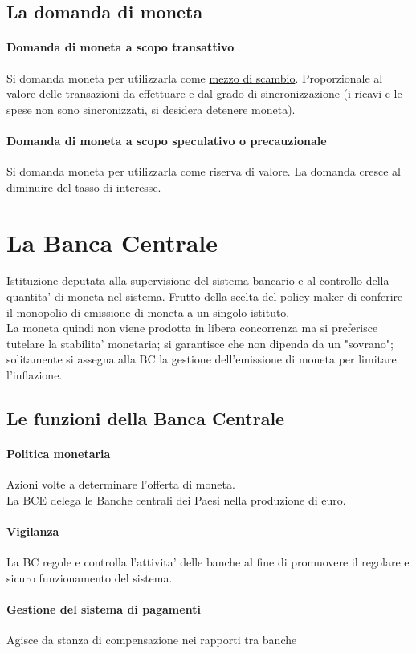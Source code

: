 \documentclass{report}
\begin{document}
	\subsection{La domanda di moneta}
	\paragraph{Domanda di moneta  a scopo transattivo} Si domanda moneta per utilizzarla come \underline{mezzo di scambio}. Proporzionale al valore delle transazioni da effettuare e dal grado di sincronizzazione (i ricavi e le spese non sono sincronizzati, si desidera detenere moneta).
	\paragraph{Domanda di moneta a scopo speculativo o precauzionale} Si domanda moneta per utilizzarla come riserva di valore. La domanda cresce al diminuire del tasso di interesse.
	\section{La Banca Centrale}
	Istituzione deputata alla supervisione del sistema bancario e al controllo della quantita' di moneta nel sistema. Frutto della scelta del policy-maker di conferire il monopolio di emissione di moneta a un singolo istituto.
	\medskip \\La moneta quindi non viene prodotta in libera concorrenza ma si preferisce tutelare la stabilita' monetaria; si garantisce che non dipenda da un "sovrano"; solitamente si assegna alla BC la gestione dell'emissione di moneta per limitare l'inflazione.
	\subsection{Le funzioni della Banca Centrale}
	\paragraph{Politica monetaria} Azioni volte a determinare l'offerta di moneta. \medskip \\La BCE delega le Banche centrali dei Paesi nella produzione di euro.
	\paragraph{Vigilanza} La BC regole e controlla l'attivita' delle banche al fine di promuovere il regolare e sicuro funzionamento del sistema.
	\paragraph{Gestione del sistema di pagamenti} Agisce da stanza di compensazione nei rapporti tra banche
\end{document}
